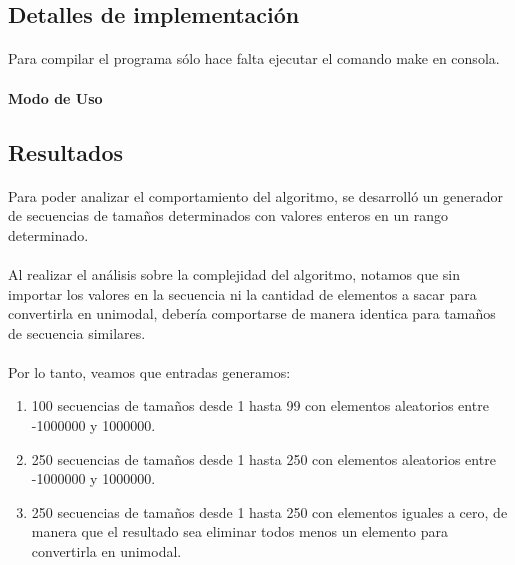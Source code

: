\subsection{Detalles de implementación}

\paragraph{}
Para compilar el programa sólo hace falta ejecutar el comando make en consola.

\paragraph{Modo de Uso}


\pagebreak[4]
\clearpage

\subsection{Resultados}
\label{resultadosej1}

\paragraph{}
Para poder analizar el comportamiento del algoritmo, se desarrolló un generador de secuencias de tamaños determinados con valores enteros en un rango determinado.

\paragraph{}
Al realizar el análisis sobre la complejidad del algoritmo, notamos que sin importar los valores en la secuencia ni la cantidad de elementos a sacar para convertirla en unimodal, debería comportarse de manera identica para tamaños de secuencia similares.

\paragraph{}
Por lo tanto, veamos que entradas generamos:
\begin{enumerate}
  \item 100 secuencias de tamaños desde 1 hasta 99 con elementos aleatorios entre -1000000 y 1000000.
  \item 250 secuencias de tamaños desde 1 hasta 250 con elementos aleatorios entre -1000000 y 1000000.
  \item 250 secuencias de tamaños desde 1 hasta 250 con elementos iguales a cero, de manera que el resultado sea eliminar todos menos un elemento para convertirla en unimodal.
\end{enumerate}



